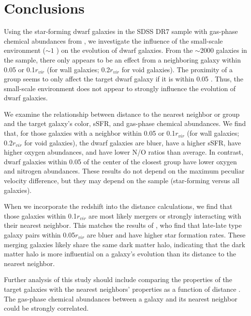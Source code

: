 \section{Conclusions}

Using the star-forming dwarf galaxies in the SDSS DR7 sample with gas-phase 
chemical abundances from \cite{Douglass17c}, we investigate the influence of the 
small-scale environment ($\sim 1$ \hMpc) on the evolution of dwarf galaxies.  
From the $\sim$2000 galaxies in the sample, there only appears to be an effect 
from a neighboring galaxy within 0.05 \hMpc or 0.1$r_{vir}$ (for wall galaxies; 
0.2$r_{vir}$ for void galaxies).  The proximity of a group seems to only affect 
the target dwarf galaxy if it is within 0.05 \hMpc.  Thus, the small-scale 
environment does not appear to strongly influence the evolution of dwarf 
galaxies.

We examine the relationship between distance to the nearest neighbor or group 
and the target galaxy's color, sSFR, and gas-phase chemical abundances.  We find 
that, for those galaxies with a neighbor within 0.05 \hMpc or 0.1$r_{vir}$ (for 
wall galaxies; 0.2$r_{vir}$ for void galaxies), the dwarf galaxies are bluer, 
have a higher sSFR, have higher oxygen abundances, and have lower N/O ratios 
than average.  In contrast, dwarf galaxies within 0.05 \hMpc of the center of 
the closest group have lower oxygen and nitrogen abundances.  These results do 
not depend on the maximum peculiar velocity difference, but they may depend on 
the sample (star-forming versus all galaxies).

When we incorporate the redshift into the distance calculations, we find that 
those galaxies within 0.1$r_{vir}$ are most likely mergers or strongly 
interacting with their nearest neighbor.  This matches the results of 
\cite{Park09}, who find that late-late type galaxy pairs within 0.05$r_{vir}$ 
are bluer and have higher star formation rates.  These merging galaxies likely 
share the same dark matter halo, indicating that the dark matter halo is more 
influential on a galaxy's evolution than its distance to the nearest neighbor.

Further analysis of this study should include comparing the properties of the 
target galaxies with the nearest neighbors' properties as a function of 
distance \citep[``galactic conformity'';][]{Weinmann06}.  The gas-phase chemical 
abundances between a galaxy and its nearest neighbor could be strongly 
correlated.
